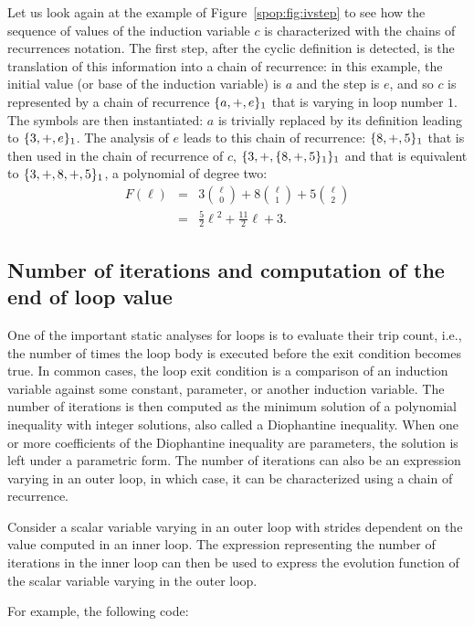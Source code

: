 {Let us look again at the example of Figure~\ref{spop:fig:ivstep} to see how the sequence of values of the induction variable $c$ is characterized with the chains of recurrences notation. 
The first step, after the cyclic definition is detected, is the translation of this information into a chain of recurrence: 
in this example, the initial value (or base of the induction variable) is $a$ and the step is $e$, and so $c$ is represented by a chain of recurrence $\{a, +, e\}_1$ that is varying in loop number $1$. 
The symbols are then instantiated: 
$a$ is trivially replaced by its definition leading to $\{3, +, e\}_1$. 
The analysis of $e$ leads to this chain of recurrence: 
$\{8, +, 5\}_1$ that is then used in the chain of recurrence of $c$, $\{3, +, \{8, +, 5\}_1\}_1$ and that is equivalent to $\{3, +, 8, +, 5\}_1$, a polynomial of degree two:
\begin{eqnarray*}
  F(\ell)
  &=& 3\binom{\ell}{0} + 8\binom{\ell}{1} + 5\binom{\ell}{2} \\
  &=& \frac{5}{2}\ell{}^2+\frac{11}{2}\ell + 3.
\end{eqnarray*}

\subsection{Number of iterations and computation of the end of loop value}
One of the important static analyses for loops is to evaluate their trip count, i.e., the number of times the loop body is executed before the exit condition becomes true. 
In common cases, the loop exit condition is a comparison of an induction variable against some constant, parameter, or another induction variable. 
The number of iterations is then computed as the minimum solution of a polynomial inequality with integer solutions, also called a Diophantine inequality. 
When one or more coefficients of the Diophantine inequality are parameters, the solution is left under a parametric form. 
The number of iterations can also be an expression varying in an outer loop, in which case, it can be characterized using a chain of recurrence.

Consider a scalar variable varying in an outer loop with strides dependent on the value computed in an inner loop. 
The expression representing the number of iterations in the inner loop can then be used to express the evolution function of the scalar variable varying in the outer loop.

For example, the following code:

}
